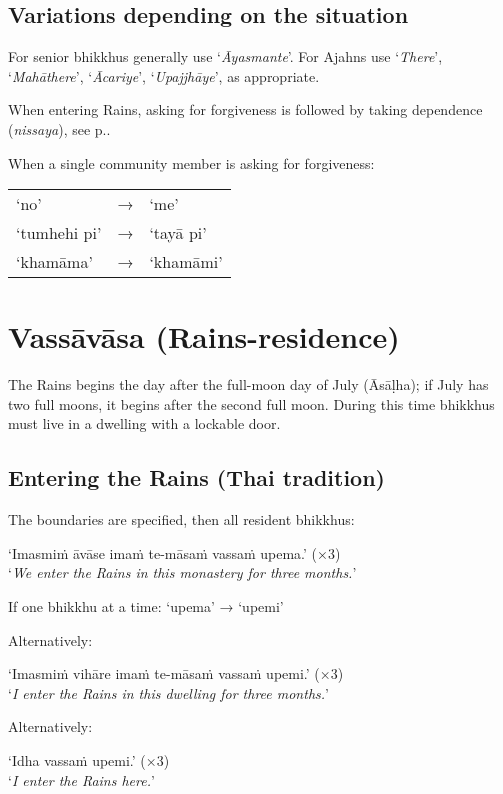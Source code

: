 \subsection*{Variations depending on the situation}

For senior bhikkhus generally use ‘\emph{Āyasmante}’. For Ajahns use ‘\emph{There}’,
‘\emph{Mahāthere}’, ‘\emph{Ācariye}’, ‘\emph{Upajjhāye}’, as appropriate.

When entering Rains, asking for forgiveness is followed by taking dependence
(\emph{nissaya}), see p.\pageref{nissaya}.

When a single community member is asking for forgiveness:

\begin{tabular}{@{}lll@{}}
‘no’ & → & ‘me’\\
‘tumhehi pi’ & → & ‘tayā pi’\\
‘khamāma’ & → & ‘khamāmi’\\
\end{tabular}

\section{Vassāvāsa (Rains-residence)}

The Rains begins the day after the full-moon day of July (Āsāḷha); if July has two full
moons, it begins after the second full moon. During this time bhikkhus must live
in a dwelling with a lockable door.

\subsection{Entering the Rains (Thai tradition)}

The boundaries are specified, then all resident bhikkhus:

‘Imasmiṁ āvāse imaṁ te-māsaṁ vassaṁ upema.’ (×3)\\
‘\emph{We enter the Rains in this monastery for three months.}’

If one bhikkhu at a time: ‘upema’ → ‘upemi’

\ifhandbookedition
\enlargethispage{\baselineskip}
\fi

Alternatively:

‘Imasmiṁ vihāre imaṁ te-māsaṁ vassaṁ upemi.’ (×3)\\
‘\emph{I enter the Rains in this dwelling for three months.}’

Alternatively:

‘Idha vassaṁ upemi.’ (×3)\\
‘\emph{I enter the Rains here.}’ 

